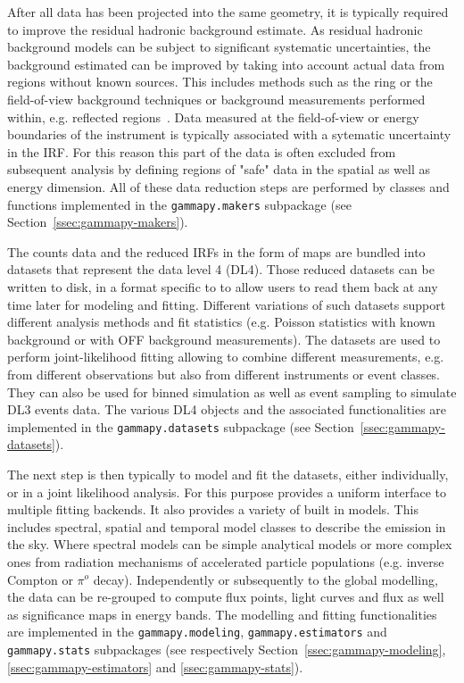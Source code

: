 \documentclass[traditabstract, longauth]{aa}
\newcommand{\code}[1]{\texttt{#1}}
\begin{document}
After all data has been projected into the same geometry, it is typically
required to improve the residual hadronic background estimate. As residual hadronic
background models can be subject to significant systematic uncertainties,
the background estimated can be improved by taking into account actual data
from regions without known \gammaray sources. This includes methods 
such as the ring or the field-of-view background techniques or
background measurements performed within, e.g. reflected regions~\citep{Berge07}.
Data measured at the field-of-view or energy boundaries of the instrument is typically
associated with a sytematic uncertainty in the IRF. For this reason this part 
of the data is often excluded from subsequent analysis by defining regions of
 "safe" data in the spatial as well as energy dimension.
All of these data reduction steps are performed by classes and functions
implemented in the \code{gammapy.makers} subpackage (see Section~\ref{ssec:gammapy-makers}).

The counts data and the reduced IRFs in the form of maps are bundled into datasets
that represent the data level 4 (DL4). Those reduced datasets can be written to disk,
in a format specific to \gammapy to allow users to read them back at any time later
for modeling and fitting. Different variations of such datasets support different 
analysis methods and fit statistics (e.g. Poisson statistics with known background or
with OFF background measurements). The datasets are used to perform joint-likelihood
fitting allowing to combine different measurements, e.g. from different observations
but also from different instruments or event classes. They can also be used for binned
simulation as well as event sampling to simulate DL3 events data.
The various DL4 objects and the associated functionalities are
implemented in the \code{gammapy.datasets} subpackage (see Section~\ref{ssec:gammapy-datasets}).


The next step is then typically to model and fit the datasets, either
individually, or in a joint likelihood analysis. For this purpose \gammapy
provides a uniform interface to multiple fitting backends. It also provides
a variety of built in models. This includes spectral,
spatial and temporal model classes to describe the \gammaray emission in the sky.
Where spectral models can be simple analytical models or more complex ones from radiation
mechanisms of accelerated particle populations (e.g. inverse Compton or $\pi^{o}$ decay).
Independently or subsequently to the global modelling, the data can be
re-grouped to compute flux points, light curves and flux as well as significance
maps in energy bands.
The modelling and fitting functionalities are implemented in the \code{gammapy.modeling},
\code{gammapy.estimators} and \code{gammapy.stats} subpackages (see respectively
Section~\ref{ssec:gammapy-modeling}, \ref{ssec:gammapy-estimators} and \ref{ssec:gammapy-stats}).
\end{document}
